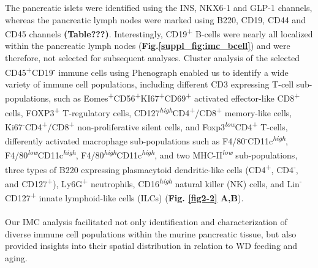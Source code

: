 The pancreatic islets were identified using the INS, NKX6-1 and GLP-1 channels, whereas the pancreatic lymph nodes were marked using B220, CD19, CD44 and CD45 channels \textbf{(Table???)}. Interestingly, CD19\textsuperscript{+} B-cells were nearly all localized within the pancreatic lymph nodes (\textbf{Fig.\ref{suppl_fig:imc_bcell}}) and were therefore, not selected for subsequent analyses. Cluster analysis of the selected CD45\textsuperscript{+}CD19\textsuperscript{-} immune cells using Phenograph enabled us to identify a wide variety of immune cell populations, including different CD3 expressing T-cell sub-populations, such as Eomes\textsuperscript{+}CD56\textsuperscript{+}KI67\textsuperscript{+}CD69\textsuperscript{+} activated effector-like CD8\textsuperscript{+} cells, FOXP3\textsuperscript{+} T-regulatory cells, CD127\textsuperscript{\textit{high}}CD4\textsuperscript{+}/CD8\textsuperscript{+} memory-like cells, Ki67\textsuperscript{-}CD4\textsuperscript{+}/CD8\textsuperscript{+} non-proliferative silent cells, and Foxp3\textsuperscript{\textit{low}}CD4\textsuperscript{+} T-cells, differently activated macrophage sub-populations such as F4/80\textsuperscript{-}CD11c\textsuperscript{\textit{high}}, F4/80\textsuperscript{\textit{low}}CD11c\textsuperscript{\textit{high}}, F4/80\textsuperscript{\textit{high}}CD11c\textsuperscript{\textit{high}}, and two MHC-II\textsuperscript{\textit{low}} sub-populations, three types of B220 expressing plasmacytoid dendritic-like cells (CD4\textsuperscript{+}, CD4\textsuperscript{-}, and CD127\textsuperscript{+}), Ly6G\textsuperscript{+} neutrophils, CD16\textsuperscript{\textit{high}} natural killer (NK) cells, and Lin\textsuperscript{-}CD127\textsuperscript{+} innate lymphoid-like cells (ILCs) (\textbf{Fig. \ref{fig2-2} A,B}).\\\\
Our IMC analysis facilitated not only identification and characterization of diverse immune cell populations within the murine pancreatic tissue, but also provided insights into their spatial distribution in relation to WD feeding and aging. 



